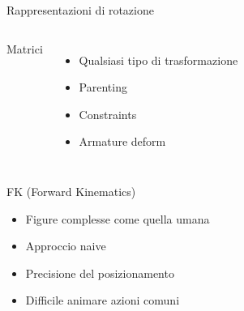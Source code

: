 \documentclass[10pt]{beamer}
\begin{document}
\begin{frame}{Rappresentazioni di rotazione}
\begin{columns}[T,onlytextwidth]
    \alert<3>{Matrici}																			%
      \begin{itemize}						%
				\item Qualsiasi tipo di trasformazione	%
				\item Parenting				%
        \item Constraints			%
				\item Armature deform	%
      \end{itemize}
  \end{columns}
\end{frame}

\begin{frame}{FK (Forward Kinematics)}					%
		\begin{itemize}[<+- | alert@+>]							%
    \item Figure complesse come quella umana    %
    \item Approccio naive												%
		\item Precisione del posizionamento					%
    \item Difficile animare azioni comuni				%
  \end{itemize}
\end{frame}
\end{document}
